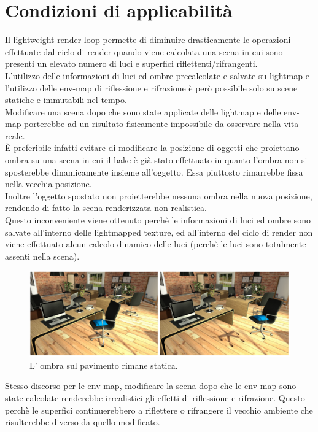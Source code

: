 \section{Condizioni di applicabilità}
\label{sec:chapter_lrl_cond_app}

Il lightweight render loop permette di diminuire drasticamente le operazioni effettuate dal ciclo di render quando viene calcolata una scena in cui sono presenti un elevato numero di luci e superfici riflettenti/rifrangenti.
\\
L’utilizzo delle informazioni di luci ed ombre precalcolate e salvate su lightmap e l’utilizzo delle env-map di riflessione e rifrazione è però possibile solo su scene statiche e immutabili nel tempo.
\\
Modificare una scena dopo che sono state applicate delle lightmap e delle env-map porterebbe ad un risultato fisicamente impossibile da osservare nella vita reale.
\\
È preferibile infatti evitare di modificare la posizione di oggetti che proiettano ombra su una scena in cui il bake è già stato effettuato in quanto l’ombra non si sposterebbe dinamicamente insieme all’oggetto. Essa piuttosto rimarrebbe fissa nella vecchia posizione.
\\ 
Inoltre l’oggetto spostato non proietterebbe nessuna ombra nella nuova posizione, rendendo di fatto la scena renderizzata non realistica. 
\\
Questo inconveniente viene ottenuto perchè le informazioni di luci ed ombre sono salvate all’interno delle lightmapped texture, ed all’interno del ciclo di render non viene effettuato alcun calcolo dinamico delle luci  (perchè le luci sono totalmente assenti nella scena).
\newpage
\begin{figure}[htb]
 \centering
 \includegraphics[width=1\linewidth]{images/chapter_lrl/lrl_appl1.png}\hfill
 \caption[Applicabilità, ombre statiche]{L' ombra sul pavimento rimane statica.}
 \label{fig:lrl_appl1}
\end{figure}
Stesso discorso per le env-map, modificare la scena dopo che le env-map sono state calcolate renderebbe irrealistici gli effetti di riflessione e rifrazione. Questo perchè le superfici continuerebbero a riflettere o rifrangere  il vecchio ambiente che risulterebbe diverso da quello modificato.
